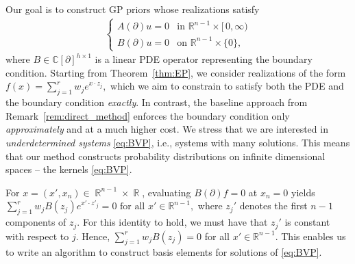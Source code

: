 \documentclass{article} %
\theoremstyle{plain}
\theoremstyle{definition}
\theoremstyle{remark}
\DeclareMathOperator*{\R}{\mathbb{R}}
\newcommand{\CC}{\mathbb{C}}
\newcommand{\RR}{\mathbb{R}}
\begin{document}
Our goal is to construct GP priors whose realizations satisfy
\begin{align}\label{eq:BVP}
   \begin{cases}
        A(\partial)u=0&\text{in }\RR^{n-1}\times[\,0,\infty)\\
    B(\partial)u=0&\text{on }\RR^{n-1}\times\{0\},
   \end{cases}
\end{align}
where $B \in \CC[\partial]^{h \times 1}$ is a linear PDE operator representing the boundary condition. Starting from Theorem~\ref{thm:EP}, we consider realizations of the form
$
f(x) = \sum_{j=1}^r w_j e^{x \cdot z_j},
$
which we aim to constrain to satisfy both the PDE and the boundary condition \emph{exactly}. In contrast, the baseline approach from Remark~\ref{rem:direct_method} enforces the boundary condition only \emph{approximately} and at a much higher cost. We stress that we are interested in \textit{underdetermined systems} \eqref{eq:BVP}, i.e., systems with many solutions. This means that our method constructs probability distributions on infinite dimensional spaces -- the kernels  \eqref{eq:BVP}.

For $x=(x',x_n)\in \R^{n-1}\times\R$, evaluating $B(\partial)f = 0$ at $x_n = 0$ yields 
$
\sum_{j=1}^r w_jB(z_j)e^{x'\cdot z'_j}=0\text{ for all }x'\in{\RR^{n-1}},
$
where $z_j'$ denotes the first $n-1$ components of $z_j$.
For this identity  to hold, we must have that $z_j'$ is constant with respect to $j$.
Hence, $\sum_{j=1}^r w_jB(z_j)=0$ for all $x'\in{\RR^{n-1}}$.
This enables us to write an algorithm to construct basis elements for solutions of \eqref{eq:BVP}. 
\end{document}

